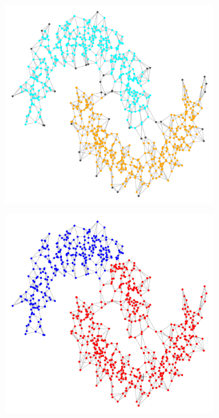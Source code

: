 \documentclass{article}
\newcommand{\1}{\mathbf{1}}
\theoremstyle{aldenthm}
\theoremstyle{aldenrmrk}
\begin{document}
\begin{figure}
\begin{adjustbox}{minipage=\linewidth,scale=0.8}
		\begin{subfigure}{.24\linewidth}
			\includegraphics[width=\linewidth]{example2plots/row2_true_density_cluster}
			\caption{}
		\end{subfigure}
		\begin{subfigure}{.24\linewidth}
			\includegraphics[width=\linewidth]{example2plots/row2_ppr_cluster}

\end{subfigure}
\end{adjustbox}
\end{figure}
\end{document}

